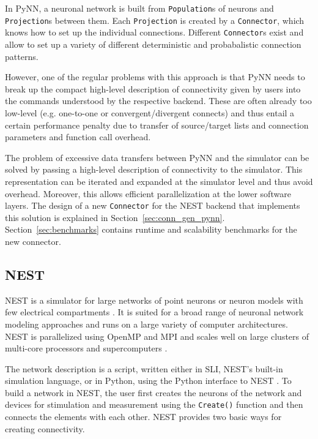 \documentclass{frontiersSCNS} %
\begin{document}
In PyNN, a neuronal network is built from \verb|Population|s of
neurons and \verb|Projection|s between them. Each \verb|Projection| is
created by a \verb|Connector|, which knows how to set up the
individual connections. Different \verb|Connector|s exist and allow to
set up a variety of different deterministic and probabalistic
connection patterns.

However, one of the regular problems with this approach is that PyNN
needs to break up the compact high-level description of connectivity
given by users into the commands understood by the respective
backend. These are often already too low-level (e.g. one-to-one or
convergent/divergent connects) and thus entail a certain performance
penalty due to transfer of source/target lists and connection
parameters and function call overhead.

The problem of excessive data transfers between PyNN and the simulator
can be solved by passing a high-level description of connectivity to
the simulator. This representation can be iterated and expanded at the
simulator level and thus avoid overhead. Moreover, this allows
efficient parallelization at the lower software layers. The design of
a new \verb|Connector| for the NEST backend that implements this
solution is explained in Section~\ref{sec:conn_gen_pynn}.
Section~\ref{sec:benchmarks} contains runtime and scalability
benchmarks for the new connector.

\subsection{NEST}\label{sec:nest}

NEST is a simulator for large networks of point neurons or neuron
models with few electrical compartments
\citep[\url{http://www.nest-initiative.org};][]{Gewaltig_07_11204}. It
is suited for a broad range of neuronal network modeling approaches
and runs on a large variety of computer architectures. NEST is
parallelized using OpenMP \citep{OpenMPSpec} and MPI
\citep{MPIForum94} and scales well on large clusters of multi-core
processors and supercomputers \citep{Helias12_26}.

The network description is a script, written either in SLI, NEST's
built-in simulation language, or in Python, using the Python interface
to NEST \citep[PyNEST;][]{Eppler09_12}. To build a network in NEST,
the user first creates the neurons of the network and devices for
stimulation and measurement using the \verb|Create()| function and
then connects the elements with each other. NEST provides two basic
ways for creating connectivity.
\end{document}
